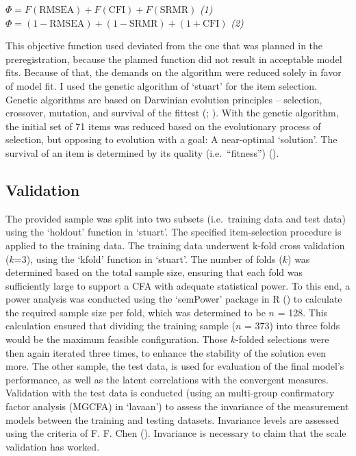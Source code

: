 \documentclass[
  12pt,
  a4paper,
  twoside]{article}
\begin{document}
\begin{center}
\hfill$\Phi = F(\textrm{RMSEA}) + F(\textrm{CFI}) + F(\textrm{SRMR})$ \hfill \textit{(1)}\\
\hfill$\Phi = (1 - \textrm{RMSEA}) + (1 - \textrm{SRMR}) + (1 + \textrm{CFI})$ \hfill \textit{(2)}
\end{center}

This objective function used deviated from the one that was planned in the preregistration, because the planned function did not result in acceptable model fits. Because of that, the demands on the algorithm were reduced solely in favor of model fit.
I used the genetic algorithm of `stuart' for the item selection. Genetic algorithms are based on Darwinian evolution principles -- selection, crossover, mutation, and survival of the fittest (; ). With the genetic algorithm, the initial set of 71 items was reduced based on the evolutionary process of selection, but opposing to evolution with a goal: A near-optimal `solution'. The survival of an item is determined by its quality (i.e.~``fitness'') ().

\subsection{Validation}\label{validation}

The provided sample was split into two subsets (i.e.~training data and test data) using the `holdout' function in `stuart'. The specified item-selection procedure is applied to the training data. The training data underwent k-fold cross validation (\(k\)=3), using the `kfold' function in `stuart'.
The number of folds (\(k\)) was determined based on the total sample size, ensuring that each fold was sufficiently large to support a CFA with adequate statistical power. To this end, a power analysis was conducted using the `semPower' package in R () to calculate the required sample size per fold, which was determined to be \(n\) = 128. This calculation ensured that dividing the training sample (\(n\) = 373) into three folds would be the maximum feasible configuration.
Those \(k\)-folded selections were then again iterated three times, to enhance the stability of the solution even more. The other sample, the test data, is used for evaluation of the final model's performance, as well as the latent correlations with the convergent measures.
Validation with the test data is conducted (using an multi-group confirmatory factor analysis (MGCFA) in `lavaan') to assess the invariance of the measurement models between the training and testing datasets. Invariance levels are assessed using the criteria of F. F. Chen (). Invariance is necessary to claim that the scale validation has worked.
\end{document}
